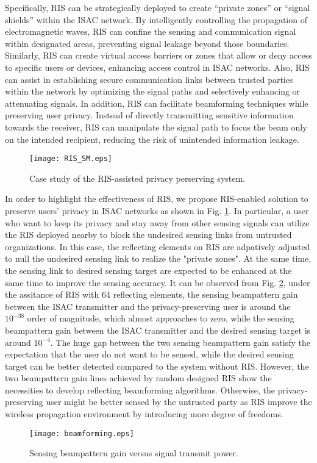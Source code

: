 \documentclass[10pt,journal,twocolumn,twoside]{IEEEtran} %
\begin{document}
Specifically, RIS can be strategically deployed to create ``private zones'' or ``signal shields'' within the ISAC network. By intelligently controlling the propagation of electromagnetic waves, RIS can confine the sensing and communication signal within designated areas, preventing signal leakage beyond those boundaries. Similarly, RIS can create virtual access barriers or zones that allow or deny access to specific users or devices, enhancing access control in ISAC networks. Also, RIS can assist in establishing secure communication links between trusted parties within the network by optimizing the signal paths and selectively enhancing or attenuating signals. In addition, RIS can facilitate beamforming techniques while preserving user privacy. Instead of directly transmitting sensitive information towards the receiver, RIS can manipulate the signal path to focus the beam only on the intended recipient, reducing the risk of unintended information leakage.

\begin{figure}[ht]
\centering
\texttt{[image: RIS\_SM.eps]}
\caption{Case study of the RIS-assisted privacy perserving system.}
\label{fig: RIS_model}
\end{figure}

In order to highlight the effectiveness of RIS, we propose RIS-enabled solution to preserve users' privacy in ISAC networks as shown in Fig. \ref{fig: RIS_model}. In particular, a user who want to keep its privacy and stay away from other sensing signals can utilize the RIS deployed nearby to block the undesired sensing links from untrusted organizations. In this case, the reflecting elements on RIS are adpatively adjusted to null the undesired sensing link to realize the "private zones". At the same time, the sensing link to desired sensing target are expected to be enhanced at the same time to improve the sensing accuracy. It can be observed from Fig. \ref{fig: RIS_B}, under the assitance of RIS with $64$ reflecting elements, the sensing beampattern gain between the ISAC transmitter and the privacy-preserving user is around the $10^{-38}$ order of magnitude, which almost approaches to zero, while the sensing beampattern gain between the ISAC transmitter and the desired sensing target is around $10^{-4}$. The huge gap between the two sensing beampattern gain satisfy the expectation that the user do not want to be sensed, while the desired sensing target can be better detected compared to the system without RIS. However, the two beampattern gain lines achieved by random designed RIS show the necessities to develop reflecting beamforming algorithms. Otherwise, the privacy-preserving user might be better sensed by the untrusted party as RIS improve the wireless propagation environment by introducing more degree of freedoms.  
\begin{figure}[ht]
\centering
\texttt{[image: beamforming.eps]}
\caption{Sensing beampattern gain versus signal transmit power.}
\label{fig: RIS_B}
\end{figure}
\end{document}
